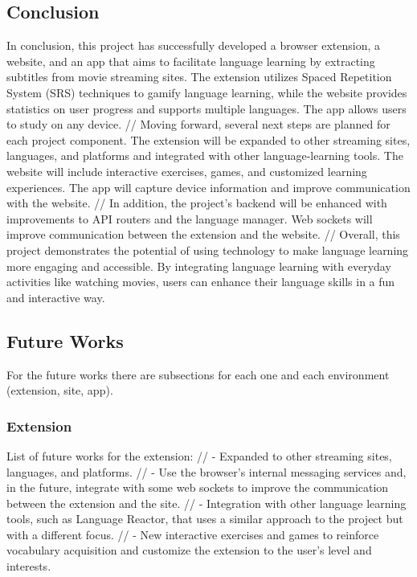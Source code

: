 \documentclass[12pt]{article}
\begin{document}
\subsection{Conclusion}
In conclusion, this project has successfully developed a browser extension, a website, and an app that aims to facilitate language learning by extracting subtitles from movie streaming sites. The extension utilizes Spaced Repetition System (SRS) techniques to gamify language learning, while the website provides statistics on user progress and supports multiple languages. The app allows users to study on any device. //
Moving forward, several next steps are planned for each project component. The extension will be expanded to other streaming sites, languages, and platforms and integrated with other language-learning tools. The website will include interactive exercises, games, and customized learning experiences. The app will capture device information and improve communication with the website. //
In addition, the project's backend will be enhanced with improvements to API routers and the language manager. Web sockets will improve communication between the extension and the website. //
Overall, this project demonstrates the potential of using technology to make language learning more engaging and accessible. By integrating language learning with everyday activities like watching movies, users can enhance their language skills in a fun and interactive way.

\subsection{Future Works}

For the future works there are subsections for each one and each environment (extension, site, app).

\subsubsection{Extension}

List of future works for the extension: //
- Expanded to other streaming sites, languages, and platforms.  //
- Use the browser's internal messaging services and, in the future, integrate with some web sockets to improve the communication between the extension and the site.  //
- Integration with other language learning tools, such as Language Reactor, that uses a similar approach to the project but with a different focus.  //
- New interactive exercises and games to reinforce vocabulary acquisition and customize the extension to the user's level and interests.
\end{document}
